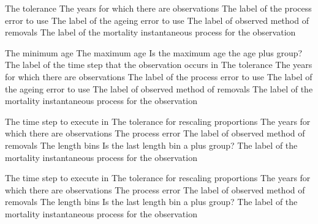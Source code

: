  {The tolerance}
 {The years for which there are observations}
 {The label of the process error to use}
 {The label of the ageing error to use}
 {The label of observed method of removals}
 {The label of the mortality instantaneous process for the observation}
\par\textbf{}\par
{} {The minimum age}
 {The maximum age}
 {Is the maximum age the age plus group?}
 {The label of the time step that the observation occurs in}
 {The tolerance}
 {The years for which there are observations}
 {The label of the process error to use}
 {The label of the ageing error to use}
 {The label of observed method of removals}
 {The label of the mortality instantaneous process for the observation}
\par\textbf{}\par
{} {The time step to execute in}
 {The tolerance for rescaling proportions}
 {The years for which there are observations}
 {The process error}
 {The label of observed method of removals}
 {The length bins}
 {Is the last length bin a plus group?}
 {The label of the mortality instantaneous process for the observation}
\par\textbf{}\par
{} {The time step to execute in}
 {The tolerance for rescaling proportions}
 {The years for which there are observations}
 {The process error}
 {The label of observed method of removals}
 {The length bins}
 {Is the last length bin a plus group?}
 {The label of the mortality instantaneous process for the observation}
\par\textbf{}\par
